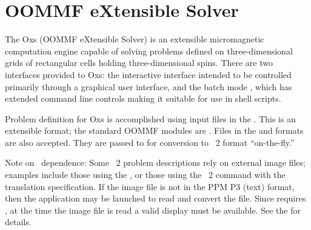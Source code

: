 \newenvironment{ExampleMifs}[1][Examples]{
\begin{sloppypar}
\raggedright\textbf{#1:} \ignorespaces}{\end{sloppypar}}

\chapter{OOMMF eXtensible Solver}\label{sec:oxs}%
%
The Oxs (OOMMF eXtensible Solver) is an extensible micromagnetic
computation engine capable of solving problems defined on
three-dimensional grids of rectangular cells holding three-dimensional
spins.  There are two interfaces provided to Oxs: the interactive
interface
intended to be controlled primarily through a graphical
user interface, and the batch mode
, which has extended
command line controls making it suitable for use in shell scripts.

Problem definition for Oxs is accomplished using input files in the
.
This is an extensible format; the standard OOMMF modules are
.
Files in the  and
formats are also accepted.  They are
passed to  for conversion to \MIF~2 format
``on-the-fly.''

Note on \Tk\ dependence: Some \MIF~2 problem descriptions rely on
external image files; examples
include those using the
%
, or those using the \MIF~2
 command with the 
translation specification.
If the image file is not in the PPM P3 (text) format, then the
 application may be
launched to read and convert the file.  Since 
requires \Tk, at the
time the image file is read a valid display must be available.  See the
{} for details.

